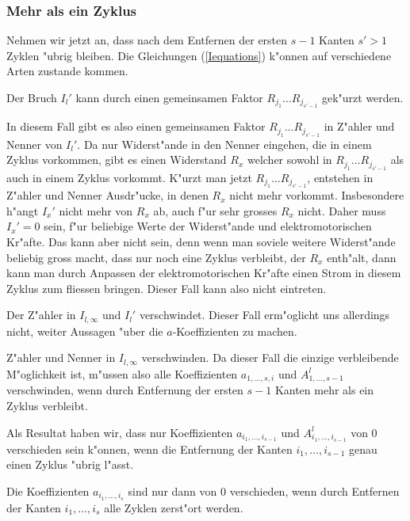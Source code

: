 \subsubsection{Mehr als ein Zyklus}
Nehmen wir jetzt an, dass nach dem Entfernen der ersten $s-1$ Kanten
$s'>1$ Zyklen "ubrig bleiben.
Die Gleichungen (\ref{Iequations}) k"onnen auf verschiedene Arten
zustande kommen.
\begin{compactenum}
\item Der Bruch $I_l'$ kann durch einen gemeinsamen Faktor
$R_{j_1}\dots R_{j_{s'-1}}$ gek"urzt werden.

In diesem Fall gibt es also einen gemeinsamen Faktor
$R_{j_1}\dots R_{j_{s'-1}}$ in Z"ahler und Nenner von $I_l'$.
Da nur Widerst"ande in den Nenner
eingehen, die in einem Zyklus vorkommen, gibt es einen Widerstand
$R_x$ welcher sowohl in $R_{j_1}\dots R_{j_{s'-1}}$ als auch in
einem Zyklus vorkommt.
K"urzt man jetzt $R_{j_1}\dots R_{j_{s'-1}}$, entstehen in Z"ahler und
Nenner Ausdr"ucke, in denen $R_x$ nicht mehr vorkommt. 
Insbesondere h"angt $I_x'$ nicht mehr von $R_x$ ab, auch f"ur sehr grosses
$R_x$ nicht. Daher muss $I_x'=0$ sein, f"ur beliebige Werte der Widerst"ande
und elektromotorischen Kr"afte.
Das kann aber nicht sein, denn wenn man soviele weitere Widerst"ande 
beliebig gross macht, dass nur noch eine Zyklus verbleibt, der $R_x$
enth"alt, dann kann man durch Anpassen der elektromotorischen Kr"afte
einen Strom in diesem Zyklus zum fliessen bringen. Dieser Fall kann
also nicht eintreten.
\item Der Z"ahler in $I_{l,\infty}$ und $I_l'$ verschwindet.
Dieser Fall erm"oglicht uns allerdings nicht, weiter Aussagen
"uber die $a$-Koeffizienten zu machen.
\item Z"ahler und Nenner in $I_{l,\infty}$ verschwinden.
Da dieser Fall die einzige verbleibende M"oglichkeit ist, m"ussen
also alle Koeffizienten $a_{1,\dots,s,i}$ und $A^l_{1,\dots,s-1}$
verschwinden, wenn durch Entfernung der ersten $s-1$ Kanten mehr als
ein Zyklus verbleibt.
\end{compactenum}
Als Resultat haben wir, dass nur Koeffizienten $a_{i_1,\dots,i_{s-1}}$
und $A_{i_1,\dots,i_{s-1}}^l$ von $0$ verschieden sein k"onnen, 
wenn die Entfernung der Kanten $i_1,\dots,i_{s-1}$ genau einen
Zyklus "ubrig l"asst.

\begin{hilfssatz}
Die Koeffizienten $a_{i_1,\dots,i_s}$ sind nur dann von $0$ verschieden,
wenn durch Entfernen der Kanten $i_1,\dots,i_s$ alle Zyklen zerst"ort
werden.
\end{hilfssatz}

